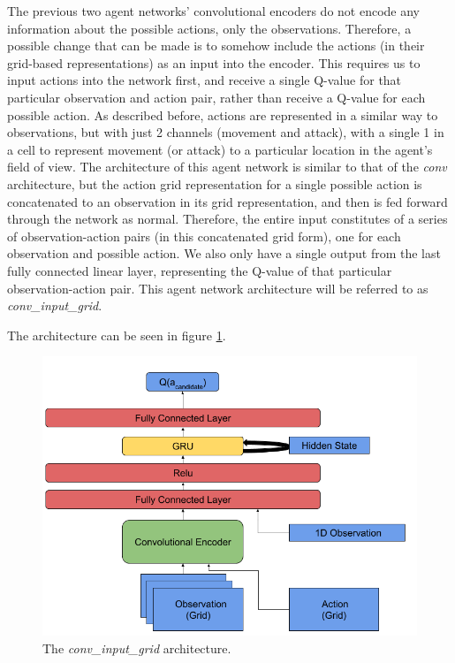The previous two agent networks’ convolutional encoders do not encode any information about the possible actions, only the observations. Therefore, a possible change that can be made is to somehow include the actions (in their grid-based representations) as an input into the encoder. This requires us to input actions into the network first, and receive a single Q-value for that particular observation and action pair, rather than receive a Q-value for each possible action. As described before, actions are represented in a similar way to observations, but with just 2 channels (movement and attack), with a single 1 in a cell to represent movement (or attack) to a particular location in the agent's field of view. The architecture of this agent network is similar to that of the \textit{conv} architecture, but the action grid representation for a single possible action is concatenated to an observation in its grid representation, and then is fed forward through the network as normal. Therefore, the entire input constitutes of a series of observation-action pairs (in this concatenated grid form), one for each observation and possible action. We also only have a single output from the last fully connected linear layer, representing the Q-value of that particular observation-action pair. This agent network architecture will be referred to as \textit{conv\_input\_grid}.

The architecture can be seen in figure \ref{fig:conv_input_grid_agent_diagram}.

\begin{figure}
    \centering
    \includegraphics[scale=0.45]{images/agent_diagrams/rnn_conv_ddpg_input_grid_agent_diagram.png}
    \caption{The \textit{conv\_input\_grid} architecture.}
    \label{fig:conv_input_grid_agent_diagram}
\end{figure}





